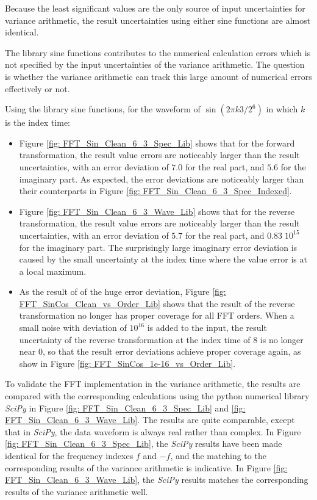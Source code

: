\documentclass[twoside]{article}
\numberwithin{equation}{section}
\begin{document}
Because the least significant values are the only source of input uncertainties for variance arithmetic, the result uncertainties using either sine functions are almost identical.

The library sine functions contributes to the numerical calculation errors which is not specified by the input uncertainties of the variance arithmetic.
The question is whether the variance arithmetic can track this large amount of numerical errors effectively or not.

Using the library sine functions, for the waveform of $\sin(2\pi k 3/2^6)$ in which $k$ is the index time:
\begin{itemize}
\item Figure \ref{fig: FFT_Sin_Clean_6_3_Spec_Lib} shows that for the forward transformation, the result value errors are noticeably larger than the result uncertainties, with an error deviation of $7.0$ for the real part, and $5.6$ for the imaginary part.
As expected, the error deviations are noticeably larger than their counterparts in Figure \ref{fig: FFT_Sin_Clean_6_3_Spec_Indexed}.

\item Figure \ref{fig: FFT_Sin_Clean_6_3_Wave_Lib} shows that for the reverse transformation, the result value errors are noticeably larger than the result uncertainties, with an error deviation of $5.7$ for the real part, and $	0.83 \; 10^{15}$ for the imaginary part. 
The surprisingly large imaginary error deviation is caused by the small uncertainty at the index time where the value error is at a local maximum.

\item As the result of of the huge error deviation, Figure \ref{fig: FFT_SinCos_Clean_vs_Order_Lib} shows that the result of the reverse transformation no longer has proper coverage for all FFT orders.
When a small noise with deviation of $10^{16}$ is added to the input, the result uncertainty of the reverse transformation at the index time of $8$ is no longer near $0$, so that the result error deviations achieve proper coverage again, as show in Figure \ref{fig: FFT_SinCos_1e-16_vs_Order_Lib}.

\end{itemize}

To validate the FFT implementation in the variance arithmetic, the results are compared with the corresponding calculations using the python numerical library \textit{SciPy} in Figure \ref{fig: FFT_Sin_Clean_6_3_Spec_Lib} and \ref{fig: FFT_Sin_Clean_6_3_Wave_Lib}.
The results are quite comparable, except that in \textit{SciPy}, the data waveform is always real rather than complex.
In Figure \ref{fig: FFT_Sin_Clean_6_3_Spec_Lib}, the \textit{SciPy} results have been made identical for the frequency indexes $f$ and $-f$, and the matching to the corresponding results of the variance arithmetic is indicative.
In Figure \ref{fig: FFT_Sin_Clean_6_3_Wave_Lib}, the \textit{SciPy} results matches the corresponding results of the variance arithmetic well.
\end{document}

